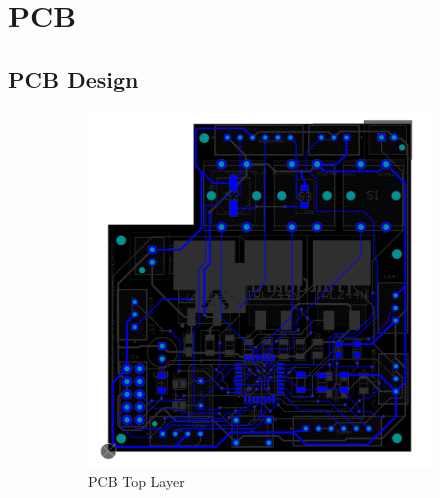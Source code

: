 \documentclass[a4paper,11pt]{article}%
\begin{document}
\newpage
\section{PCB}

\subsection{PCB Design}

\begin{figure}[!h]
    \centering
    \begin{subfigure}[b]{0.27\textwidth}
        \centering
        \includegraphics[width=\textwidth]{./figures/PCBBottomLayer.png}
        \caption{PCB Top Layer}
        \label{fig:image2}
    \end{subfigure}
    \hfill
    \begin{subfigure}[b]{0.27\textwidth}
        \centering

\end{subfigure}
\end{figure}
\end{document}
